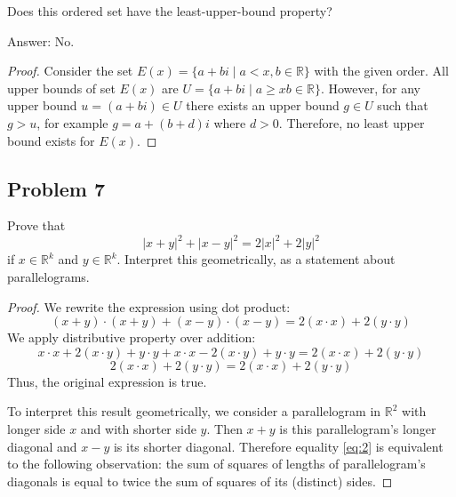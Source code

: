 \documentclass{article}
\newcommand{\R}{\mathbb{R}}
\begin{document}
\begin{tcolorbox}
Does this ordered set have the least-upper-bound
property? 
\end{tcolorbox}
Answer: No.

\begin{proof}
Consider the set $E(x) = \{ a+bi \mid a<x, b \in \R \}$ with the given order. All upper bounds of set $E(x)$ are $U = \{a+bi \mid a \geq x b \in \R\}$. However, for any upper bound $u = (a+bi) \in U$ there exists an upper bound $g \in U$ such that $g > u$, for example $g = a+(b+d)i$ where $d>0$. Therefore, no least upper bound exists for $E(x)$.
\end{proof}

\subsection*{Problem 7}

\begin{tcolorbox}
Prove that
\begin{equation} \label{eq:2}
    |x + y|^2 + |x - y|^2 = 2|x|^2 + 2|y|^2    
\end{equation}
if $x \in \R^k$ and $y \in \R^k$. Interpret this geometrically, as a statement about parallelograms.
\end{tcolorbox}

\begin{proof}

We rewrite the expression using dot product:
\[ (x+y) \cdot (x+y) + (x-y) \cdot (x-y) = 2 (x\cdot x) + 2 (y\cdot y) \]
We apply distributive property over addition:
\[ x \cdot x + 2(x \cdot y) + y \cdot y + x \cdot x - 2(x \cdot y) + y \cdot y = 2 (x \cdot x) + 2 (y\cdot y) \]
\[ 2 (x\cdot x) + 2 (y\cdot y) = 2 (x\cdot x) + 2 (y\cdot y) \]
Thus, the original expression is true.

To interpret this result geometrically, we consider a parallelogram in $\R^2$ with longer side $x$ and with shorter side $y$.
Then $x+y$ is this parallelogram's longer diagonal and $x-y$ is its shorter diagonal.
Therefore equality \ref{eq:2} is equivalent to the following observation:
the sum of squares of lengths of parallelogram's diagonals is equal to twice the sum of squares of its (distinct) sides.

\end{proof}
\end{document}
